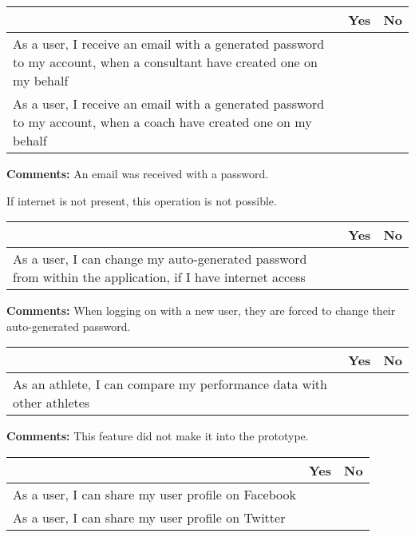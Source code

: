 \begin{tabularx}{\textwidth}{|b|c|c|}
	\hline
	 & Yes & No \\
	\hline
	As a user, I receive an email with a generated password to my account, when a consultant have created one on my behalf & \xmark & \\
	\hline
	As a user, I receive an email with a generated password to my account, when a coach have created one on my behalf & \xmark & \\
	\hline
\end{tabularx}

\vspace{3mm}
\textbf{Comments:}
An email was received with a password.
\vspace{3mm}


If internet is not present, this operation is not possible.

\begin{tabularx}{\textwidth}{|b|c|c|}
	\hline
	 & Yes & No \\
	\hline
	As a user, I can change my auto-generated password from within the application, if I have internet access & \xmark & \\
	\hline
\end{tabularx}

\vspace{3mm}
\textbf{Comments:}
When logging on with a new user, they are forced to change their auto-generated password.
\vspace{3mm}


\begin{tabularx}{\textwidth}{|b|c|c|}
	\hline
	 & Yes & No \\
	\hline
	As an athlete, I can compare my performance data with other athletes &   & \xmark  \\
	\hline
\end{tabularx}

\vspace{3mm}
\textbf{Comments:}
This feature did not make it into the prototype.
\vspace{3mm}


\begin{tabularx}{\textwidth}{|b|c|c|}
	\hline
	 & Yes & No \\
	\hline
	As a user, I can share my user profile on Facebook &   & \xmark  \\
	\hline
	As a user, I can share my user profile on Twitter &   & \xmark  \\
	\hline
\end{tabularx}


